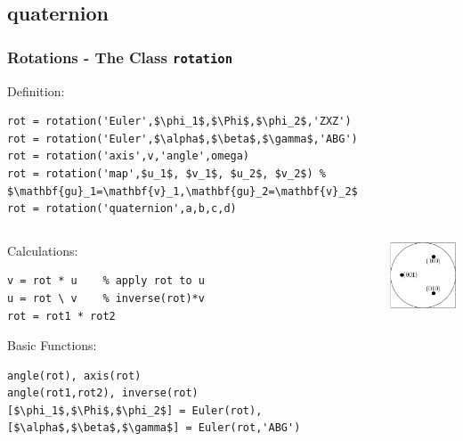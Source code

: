 \subsection*{quaternion}


\begin{frame}[fragile]
  \frametitle{Rotations - The \MTEX Class \texttt{\bf rotation}}

Definition:

\begin{lstlisting}[mathescape=true]
rot = rotation('Euler',$\phi_1$,$\Phi$,$\phi_2$,'ZXZ')
rot = rotation('Euler',$\alpha$,$\beta$,$\gamma$,'ABG')
rot = rotation('axis',v,'angle',omega)
rot = rotation('map',$u_1$, $v_1$, $u_2$, $v_2$) % $\mathbf{gu}_1=\mathbf{v}_1,\mathbf{gu}_2=\mathbf{v}_2$
rot = rotation('quaternion',a,b,c,d)
\end{lstlisting}

\begin{columns}
  \begin{column}{8.5cm}

    Calculations:

\begin{lstlisting}
v = rot * u    % apply rot to u
u = rot \ v    % inverse(rot)*v
rot = rot1 * rot2
\end{lstlisting}

    Basic Functions:

\begin{lstlisting}[mathescape=true]
angle(rot), axis(rot)
angle(rot1,rot2), inverse(rot)
[$\phi_1$,$\Phi$,$\phi_2$] = Euler(rot), [$\alpha$,$\beta$,$\gamma$] = Euler(rot,'ABG')
\end{lstlisting}

  \end{column}

  \begin{column}{3cm}
    \includegraphics[width=3cm]{pic/quaternion}
  \end{column}

\end{columns}
\end{frame}



